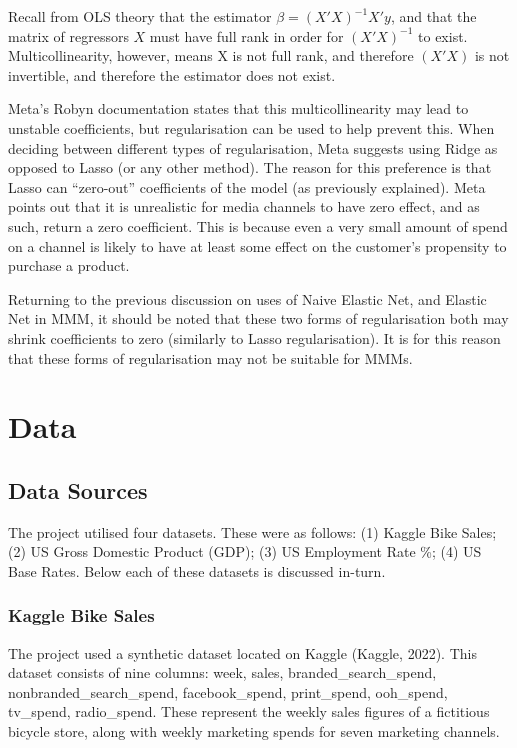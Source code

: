 \documentclass[11pt, a4paper]{article}
\begin{document}
Recall from OLS theory that the estimator $\beta=(X'X)^{-1}X'y$, and that the matrix of regressors $X$ must have full rank in order for $(X'X)^{-1}$ to exist. Multicollinearity, however, means X is not full rank, and therefore $(X'X)$ is not invertible, and therefore the estimator does not exist.

Meta’s Robyn documentation states that this multicollinearity may lead to unstable coefficients, but regularisation can be used to help prevent this. When deciding between different types of regularisation, Meta suggests using Ridge as opposed to Lasso (or any other method). The reason for this preference is that Lasso can “zero-out” coefficients of the model (as previously explained). Meta points out that it is unrealistic for media channels to have zero effect, and as such, return a zero coefficient. This is because even a very small amount of spend on a channel is likely to have at least some effect on the customer’s propensity to purchase a product. 

Returning to the previous discussion on uses of Naive Elastic Net, and Elastic Net in MMM, it should be noted that these two forms of regularisation both may shrink coefficients to zero (similarly to Lasso regularisation). It is for this reason that these forms of regularisation may not be suitable for MMMs. 

\section{Data}
\subsection{Data Sources}
The project utilised four datasets. These were as follows: (1) Kaggle Bike Sales; (2) US Gross Domestic Product (GDP); (3) US Employment Rate \%; (4) US Base Rates. Below each of these datasets is discussed in-turn.

\subsubsection{Kaggle Bike Sales}
The project used a synthetic dataset located on Kaggle (Kaggle, 2022). This dataset consists of nine columns: week, sales, branded\_search\_spend, nonbranded\_search\_spend, facebook\_spend, print\_spend, ooh\_spend, tv\_spend, radio\_spend. These represent the weekly sales figures of a fictitious bicycle store, along with weekly marketing spends for seven marketing channels. 
\end{document}
